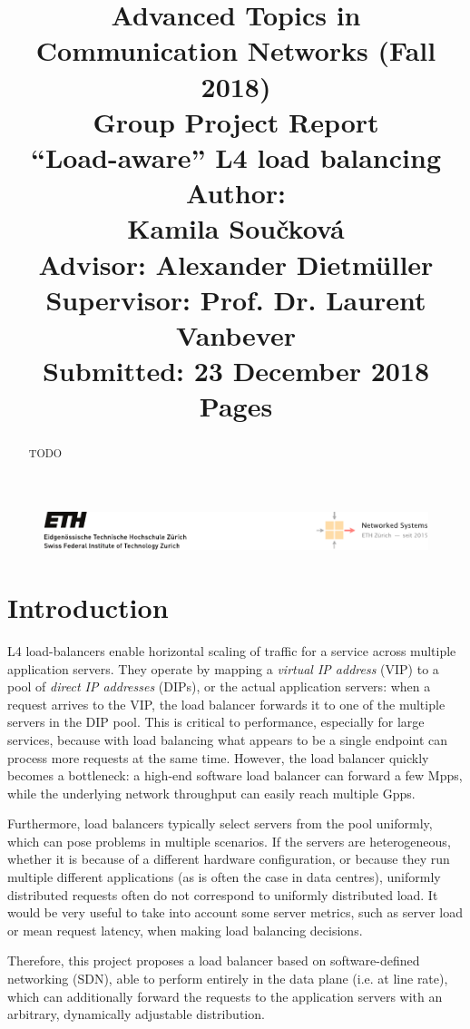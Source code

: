 \documentclass[11pt,oneside,a4paper]{article}
\title{
    \vspace*{0.0mm}
    \LARGE\bf\sf Advanced Topics in \\Communication Networks (Fall 2018)
    \vspace*{10.0mm} \\
    \Large\bf\sf Group Project Report \vspace*{30.0mm}\\
    \Huge\bf\sf ``Load-aware'' L4 load balancing
    \vspace*{30.0mm} \\
    \normalsize
    \sf Author:\\[5pt]
    \sf Kamila Sou\v{c}kov\'{a} \\ [5pt]
    \sf  Advisor:  Alexander Dietm\"{u}ller \vspace*{5mm}\\
    \sf  Supervisor:  Prof. Dr. Laurent Vanbever \vspace*{20.0mm}\\
    \sf Submitted: 23 December 2018\\ [5pt]
    \sf \pageref{lastpage} Pages
}
\date{}
\begin{document}
\begin{figure}
    \includegraphics[width=\textwidth]{figures/eth-nsg-header}
\end{figure}

\maketitle
\thispagestyle{empty}
\raggedbottom
\clearpage


\begin{abstract}
    TODO
    \lipsum[1-3]
\end{abstract}

\clearpage
\setcounter{tocdepth}{2}
\tableofcontents
\clearpage
{}

\section{Introduction}
L4 load-balancers enable horizontal scaling of traffic for a service across
multiple application servers.
They operate by mapping a \emph{virtual IP address} (VIP) to a pool of
\emph{direct IP addresses} (DIPs), or the actual application servers: when a
request arrives to the VIP, the load balancer forwards it to one of the multiple
servers in the DIP pool.
This is critical to performance, especially for large services, because with
load balancing what appears to be a single endpoint can process more requests at
the same time.
However, the load balancer quickly becomes a bottleneck: a high-end software
load balancer can forward a few Mpps, while the underlying network throughput
can easily reach multiple Gpps.\cite{maglev}

Furthermore, load balancers typically select servers from the pool uniformly,
which can pose problems in multiple scenarios.  If the servers are
heterogeneous, whether it is because of a different hardware configuration, or
because they run multiple different applications (as is often the case in data
centres), uniformly distributed requests often do not correspond to uniformly
distributed load.
It would be very useful to take into account some server metrics, such as server
load or mean request latency, when making load balancing decisions.

Therefore, this project proposes a load balancer based on software-defined
networking (SDN), able to perform entirely in the data plane (i.e. at line
rate), which can additionally forward the requests to the application servers
with an arbitrary, dynamically adjustable distribution.
\end{document}
